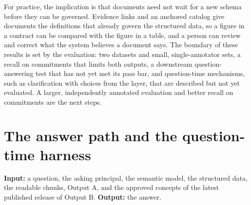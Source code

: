 \documentclass[11pt,a4paper]{article}
\begin{document}
For practice, the implication is that documents need not wait for a new schema before they can be governed. Evidence links and an anchored catalog give documents the definitions that already govern the structured data, so a figure in a contract can be compared with the figure in a table, and a person can review and correct what the system believes a document says. The boundary of these results is set by the evaluation: two datasets and small, single-annotator sets, a recall on commitments that limits both outputs, a downstream question-answering test that has not yet met its pass bar, and question-time mechanisms, such as clarification with choices from the layer, that are described but not yet evaluated. A larger, independently annotated evaluation and better recall on commitments are the next steps.




\appendix
\section{The answer path and the question-time harness}\label{sec:answer}
\noindent\textbf{Input:} a question, the asking principal, the semantic model, the structured data, the readable chunks, Output A, and the approved concepts of the latest published release of Output B. \textbf{Output:} the answer.
\end{document}
